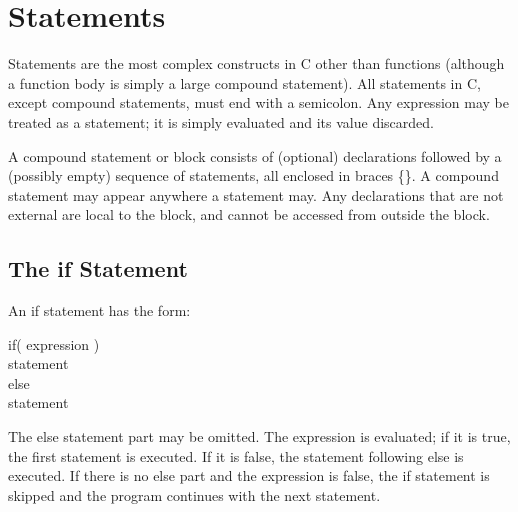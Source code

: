 
\section{Statements}

     Statements are  the most  complex constructs  in C  other than
functions (although  a  function  body  is  simply  a  large
compound  statement).  All statements in  C, except  compound
statements,  must end with a semicolon. Any expression may be treated
as a statement; it is simply evaluated and its value discarded.

     A  {\kc compound  statement\/}  or 
{\kc block\/}  consists  of
(optional)  declarations followed by  a (possibly empty) sequence of
statements, all enclosed in braces {\cd \{\}}. A compound statement may
appear anywhere a statement may. Any declarations that are  not {\cd
extern}al  are local  to the  block, and  cannot be accessed from
outside the block.


\subsection{The {\cd if} Statement}
     An {\cd if} statement has the form:
\begin{code}
if( {\ms expression\/} ) \\
 \> {\ms statement\/} 	 \\
else 							 \\
 \> {\ms statement\/}
\end{code}
\noindent
     The {\cd else}  {\ms statement\/} part may be omitted.  The
expression is evaluated; if it is  true, the  first statement  is
executed.  If it is false, the statement following {\cd else}  is
executed.  If there  is no  {\cd else} part and the expression is
false, the  {\cd if} statement  is skipped  and the  program
continues with the next statement.

